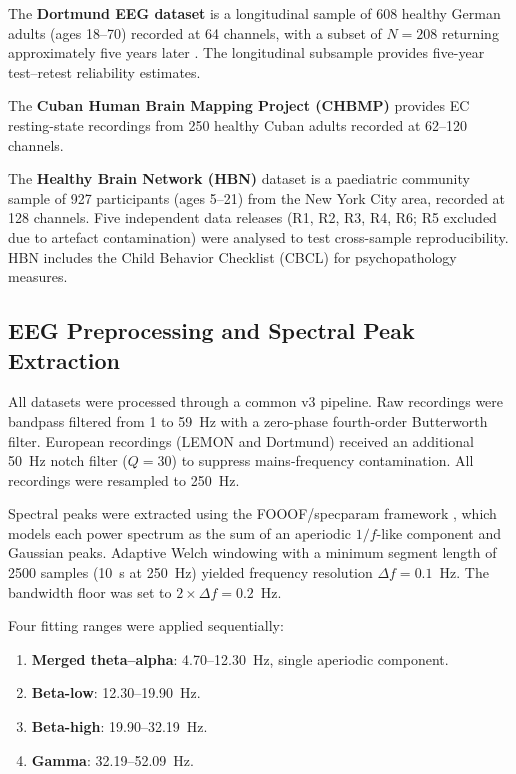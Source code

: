 The \textbf{Dortmund EEG dataset} is a longitudinal sample of 608 healthy German adults (ages 18--70) recorded at 64 channels, with a subset of $N = 208$ returning approximately five years later \parencite{vossen2015dortmund}. The longitudinal subsample provides five-year test--retest reliability estimates.

The \textbf{Cuban Human Brain Mapping Project (CHBMP)} provides EC resting-state recordings from 250 healthy Cuban adults recorded at 62--120 channels.

The \textbf{Healthy Brain Network (HBN)} dataset \parencite{alexander2017hbn} is a paediatric community sample of 927 participants (ages 5--21) from the New York City area, recorded at 128 channels. Five independent data releases (R1, R2, R3, R4, R6; R5 excluded due to artefact contamination) were analysed to test cross-sample reproducibility. HBN includes the Child Behavior Checklist (CBCL) for psychopathology measures.

\subsection{EEG Preprocessing and Spectral Peak Extraction}
\label{sec:extraction}

All datasets were processed through a common v3 pipeline. Raw recordings were bandpass filtered from 1 to 59~Hz with a zero-phase fourth-order Butterworth filter. European recordings (LEMON and Dortmund) received an additional 50~Hz notch filter ($Q = 30$) to suppress mains-frequency contamination. All recordings were resampled to 250~Hz.

Spectral peaks were extracted using the FOOOF/specparam framework \parencite{donoghue2020fooof}, which models each power spectrum as the sum of an aperiodic $1/f$-like component and Gaussian peaks. Adaptive Welch windowing with a minimum segment length of 2500 samples (10~s at 250~Hz) yielded frequency resolution $\Delta f = 0.1$~Hz. The bandwidth floor was set to $2 \times \Delta f = 0.2$~Hz.

Four fitting ranges were applied sequentially:
\begin{enumerate}
    \item \textbf{Merged theta--alpha}: 4.70--12.30~Hz, single aperiodic component.
    \item \textbf{Beta-low}: 12.30--19.90~Hz.
    \item \textbf{Beta-high}: 19.90--32.19~Hz.
    \item \textbf{Gamma}: 32.19--52.09~Hz.
\end{enumerate}


